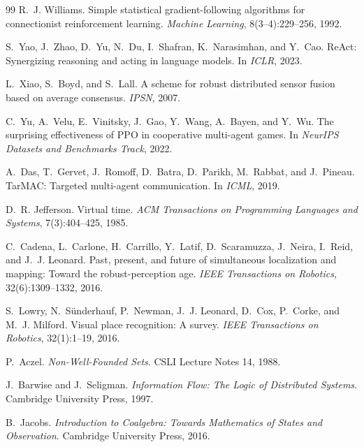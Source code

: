 \documentclass{article}
\begin{document}
\begin{thebibliography}{99}
R.~J. Williams.
\newblock Simple statistical gradient-following algorithms for connectionist reinforcement learning.
\newblock \emph{Machine Learning}, 8(3--4):229--256, 1992.

S.~Yao, J.~Zhao, D.~Yu, N.~Du, I.~Shafran, K.~Narasimhan, and Y.~Cao.
\newblock ReAct: Synergizing reasoning and acting in language models.
\newblock In \emph{ICLR}, 2023.

L.~Xiao, S.~Boyd, and S.~Lall.
\newblock A scheme for robust distributed sensor fusion based on average consensus.
\newblock \emph{IPSN}, 2007.

C.~Yu, A.~Velu, E.~Vinitsky, J.~Gao, Y.~Wang, A.~Bayen, and Y.~Wu.
\newblock The surprising effectiveness of PPO in cooperative multi-agent games.
\newblock In \emph{NeurIPS Datasets and Benchmarks Track}, 2022.

A.~Das, T.~Gervet, J.~Romoff, D.~Batra, D.~Parikh, M.~Rabbat, and
J.~Pineau.
\newblock TarMAC: Targeted multi-agent communication.
\newblock In \emph{ICML}, 2019.

D.~R. Jefferson.
\newblock Virtual time.
\newblock \emph{ACM Transactions on Programming Languages and Systems},
7(3):404--425, 1985.

C.~Cadena, L.~Carlone, H.~Carrillo, Y.~Latif, D.~Scaramuzza,
J.~Neira, I.~Reid, and J.~J. Leonard.
\newblock Past, present, and future of simultaneous localization and
mapping: Toward the robust-perception age.
\newblock \emph{IEEE Transactions on Robotics}, 32(6):1309--1332, 2016.

S.~Lowry, N.~S\"underhauf, P.~Newman, J.~J. Leonard, D.~Cox,
P.~Corke, and M.~J. Milford.
\newblock Visual place recognition: A survey.
\newblock \emph{IEEE Transactions on Robotics}, 32(1):1--19, 2016.

P.~Aczel.
\newblock \emph{Non-Well-Founded Sets}.
\newblock CSLI Lecture Notes 14, 1988.

J.~Barwise and J.~Seligman.
\newblock \emph{Information Flow: The Logic of Distributed Systems}.
\newblock Cambridge University Press, 1997.

B.~Jacobs.
\newblock \emph{Introduction to Coalgebra: Towards Mathematics of States and Observation}.
\newblock Cambridge University Press, 2016.


\end{thebibliography}
\end{document}
